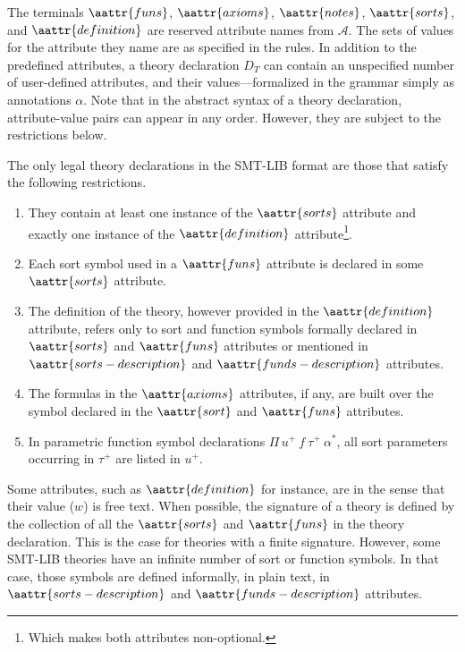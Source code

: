 The terminals 
$\aattr{funs}$, 
$\aattr{axioms}$, 
$\aattr{notes}$, 
$\aattr{sorts}$,
and
$\aattr{definition}$
are reserved attribute names from $\mathcal{A}$. 
The sets of values for the attribute they name are as specified in the rules.
In addition to the predefined attributes,
a theory declaration $D_T$ can contain an unspecified number of 
user-defined attributes, and their values---formalized in the grammar 
simply as annotations $\alpha$.
Note that
in the abstract syntax of a theory declaration,
attribute-value pairs can appear in any order.
However, they are subject to the restrictions below.

\begin{definition}
\label{def:theory}
The only legal theory declarations in the SMT-LIB format are those 
that satisfy the following restrictions.
\begin{enumerate}
\item
They contain at least one instance of the $\aattr{sorts}$ attribute and 
exactly one instance of the $\aattr{definition}$ attribute\footnote{
Which makes both attributes non-optional.
}.

\item
Each sort symbol used in a $\aattr{funs}$ attribute is declared 
in some $\aattr{sorts}$ attribute.

\item
The definition of the theory, however provided in the $\aattr{definition}$ attribute,
refers only to sort and function symbols formally declared
in $\aattr{sorts}$ and $\aattr{funs}$ attributes or 
mentioned in $\aattr{sorts-description}$ and $\aattr{funds-description}$ attributes.

\item
The formulas in the $\aattr{axioms}$ attributes, if any,
are built over the symbol declared in the $\aattr{sort}$ and $\aattr{funs}$
attributes.

\item
In parametric function symbol declarations $\Pi\, u^+\: f\: \tau^+\: \alpha^*$,
all sort parameters occurring in $\tau^+$ are listed in $u^+$. 
\end{enumerate}
\end{definition}


Some attributes, such as $\aattr{definition}$ for instance,
are  in the sense that 
their value ($w$) is free text.
When possible,
the signature of a theory is defined by 
the collection of all the $\aattr{sorts}$ and $\aattr{funs}$ 
in the theory declaration.
This is the case for theories with a finite signature.
However, some SMT-LIB theories have an infinite number of sort 
or function symbols.
In that case, 
those symbols are defined informally, in plain text,
in $\aattr{sorts-description}$ and $\aattr{funds-description}$ attributes.

